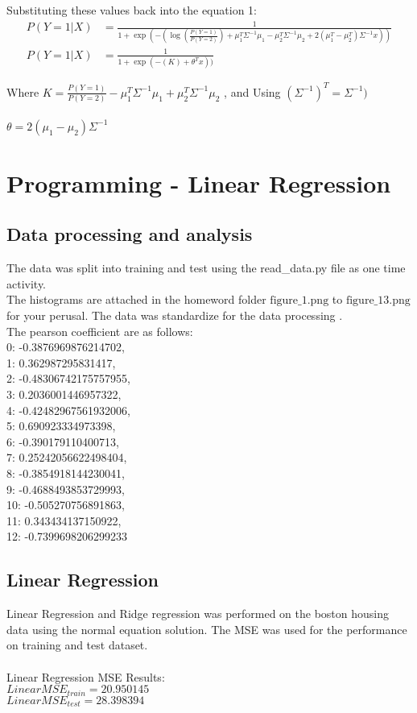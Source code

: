 \documentclass[10pt,letterpaper]{article}
\begin{document}
		Substituting  these values back into the equation 1:
\begin{align*}
P(Y=1|X) &= \frac{1}{1+\exp(-(\log(\frac{P(Y=1)}{P(Y=2)})+ \mu_1^T \Sigma^{-1} \mu_1 - \mu_2^T \Sigma^{-1} \mu_2+2(\mu_1^T-\mu_2^T)\Sigma^{-1}x  ))}\\
P(Y=1|X) &= \frac{1}{1+\exp(-(K)+\theta^T x  ))} 
\end{align*}
		
		Where $K = \frac{P(Y=1)}{P(Y=2)}- \mu_1^T \Sigma^{-1} \mu_1 + \mu_2^T \Sigma^{-1} \mu_2$ , and	Using $ (\Sigma^{-1})^T = \Sigma^{-1})$\\\\
		$\theta = 2(\mu_1-\mu_2)\Sigma^{-1}$

\newpage
\section{Programming - Linear Regression}
\subsection{ Data processing and analysis }
The data was split into training and test using the read\_data.py file as one time activity.\\
The histograms are attached in the homeword folder  $\text{figure\_1.png}$ to $\text{figure\_13.png}$ for your perusal. The data was standardize for the data processing .\\

The pearson coefficient are as follows:\\
0: -0.3876969876214702,\\ 1: 0.362987295831417,\\ 2: -0.48306742175757955,\\ 3: 0.2036001446957322,\\ 4: -0.42482967561932006,\\ 5: 0.690923334973398,\\ 6: -0.390179110400713,\\ 7: 0.25242056622498404,\\ 8: -0.3854918144230041,\\ 9: -0.4688493853729993,\\ 10: -0.505270756891863,\\ 11: 0.343434137150922,\\ 12: -0.7399698206299233

\subsection{Linear Regression}
Linear Regression and Ridge regression was performed on the boston housing data using the normal equation solution. The MSE was used for the performance on training and test dataset.\\\\
Linear Regression MSE Results:\\
$Linear MSE_{train} = 20.950145$\\
$Linear MSE_{test} = 28.398394$\\\\
\end{document}
